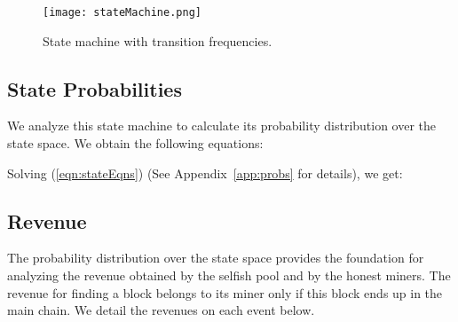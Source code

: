 \documentclass[letterpaper]{llncs}
\begin{document}
\begin{figure}[!t] 
\centering
\texttt{[image: stateMachine.png]}
\caption{ 
State machine with transition frequencies. 
} 
\label{fig:stateMachine} 
\end{figure}

        \subsection{State Probabilities}

We analyze this state machine to calculate its probability distribution over the state space. We obtain the following equations: 
 
Solving (\ref{eqn:stateEqns}) (See Appendix~\ref{app:probs} for details), we get: 
 

        \subsection{Revenue} 

The probability distribution over the state space provides the foundation for analyzing the revenue obtained by the selfish pool and by the honest miners. The revenue for finding a block belongs to its miner only if this block ends up in the main chain. We detail the revenues on each event below.
\end{document}
